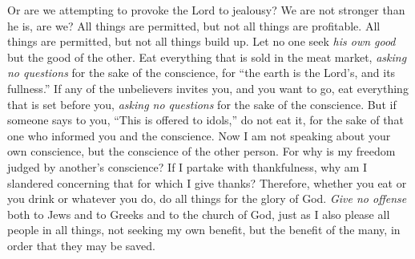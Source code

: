 \begin{biblechapter}
\verse Or are we attempting to provoke the Lord to jealousy? We are not stronger than he is, are we?
 All things are permitted, but not all things are profitable. All things are permitted, but not all things build up.
\verse Let no one seek \textit{his own good} but the good of the other.
\verse Eat everything that is sold in the meat market, \textit{asking no questions} for the sake of the conscience,
\verse for “the earth is the Lord’s, and its fullness.”
\verse If any of the unbelievers invites you, and you want to go, eat everything that is set before you, \textit{asking no questions} for the sake of the conscience.
\verse But if someone says to you, “This is offered to idols,” do not eat it, for the sake of that one who informed you and the conscience.
\verse Now I am not speaking about your own conscience, but the conscience of the other person. For why is my freedom judged by another’s conscience?
\verse If I partake with thankfulness, why am I slandered concerning that for which I give thanks?
\verse Therefore, whether you eat or you drink or whatever you do, do all things for the glory of God.
\verse \textit{Give no offense} both to Jews and to Greeks and to the church of God,
\verse just as I also please all people in all things, not seeking my own benefit, but the benefit of the many, in order that they may be saved.
\end{biblechapter}

